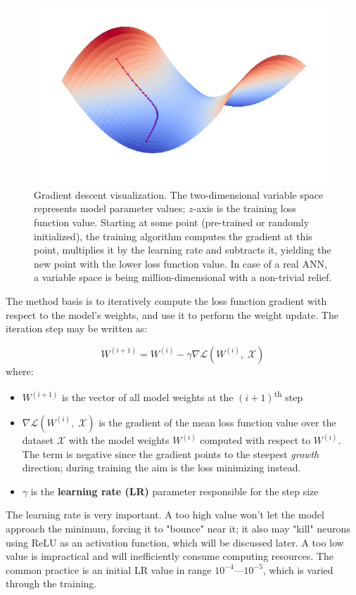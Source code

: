 \documentclass[thesis=B,english]{FITthesis}[2019/12/23]
\begin{document}
	\begin{figure}[h]
		\includegraphics[width=\textwidth]{images/grad.png}
		\caption{Gradient descent visualization. The two-dimensional variable space represents model parameter values; $z$-axis is the training loss function value. Starting at some point (pre-trained or randomly initialized), the training algorithm computes the gradient at this point, multiplies it by the learning rate and subtracts it, yielding the new point with the lower loss function value. In case of a real ANN, a variable space is being million-dimensional with a non-trivial relief.}
	\end{figure}
	
	The method basis is to iteratively compute the loss function gradient with respect to the model's weights, and use it to perform the weight update. The iteration step may be written as:
	
	\[W^{(i+1)} = W^{(i)} - \gamma \nabla \mathcal{L}(W^{(i)},\; \mathcal{X})\]
	where:
	\begin{itemize}
		\item $W^{(i+1)}$ is the vector of all model weights at the $(i+1)$\textsuperscript{th} step
		\item $\nabla \mathcal{L}(W^{(i)},\; \mathcal{X})$ is the gradient of the mean loss function value over the dataset $\mathcal{X}$ with the model weights $W^{(i)}$ computed with respect to $W^{(i)}$. The term is negative since the gradient points to the steepest \textit{growth} direction; during training the aim is the loss minimizing instead.
		\item $\gamma$ is the \textbf{learning rate (LR)} parameter responsible for the step size
	\end{itemize}
	
	The learning rate is very important. A too high value won't let the model approach the minimum, forcing it to "bounce" near it; it also may "kill" neurons using ReLU as an activation function, which will be discussed later. A too low value is impractical and will inefficiently consume computing resources. The common practice is an initial LR value in range $10^{-4}$---$10^{-5}$, which is varied through the training.
	
\end{document}
